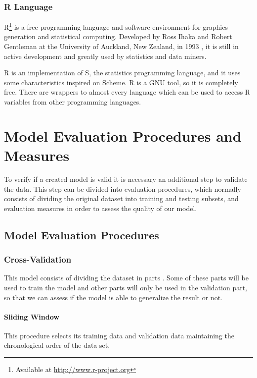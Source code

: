 \subsubsection{R Language}
R\footnote{ Available at \url{http://www.r-project.org}} is a free programming language and software environment for graphics generation and statistical computing.
Developed by Ross Ihaka and Robert Gentleman at the University of Auckland, New Zealand, in 1993 \cite{Ihaka98r:past}, it is still in active development and
greatly used by statistics and data miners.

R is an implementation of S, the statistics programming language, and it uses some characteristics inspired on Scheme.
R is a GNU tool, so it is completely free. There are wrappers to almost every language which can be used to access R variables from other programming languages.

\section{Model Evaluation Procedures and Measures}

To verify if a created model is valid it is necessary an additional step to validate the data.
This step can be divided into evaluation procedures, which normally
consists of dividing the original dataset into training and testing subsets, and
evaluation measures in order to assess the quality of our model.

\subsection{Model Evaluation Procedures}
\subsubsection{Cross-Validation}

This model consists of dividing the dataset in parts \cite{Witten:2005:DMP:1205860}
. Some of these parts will be used to train the model and other parts will only
be used in the validation part, so that we can assess if the model is able to
generalize the result or not. 

\paragraph{Sliding Window}

This procedure selects its training data and validation data maintaining the
chronological order of the data set\cite{Bensch_self-learningprediction}.

